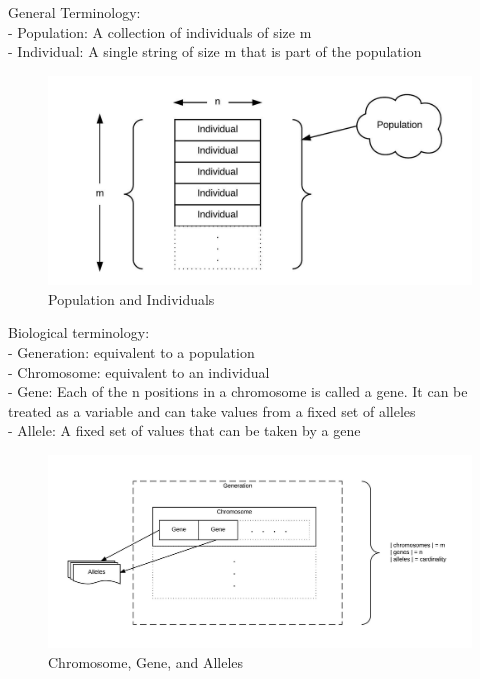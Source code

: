 \documentclass[12pt,a4paper]{article}
\begin{document}
	General Terminology: \\
	- Population: A collection of individuals of size m \\
	- Individual: A single string of size m that is part of the population \par
   	\begin{figure}[H]
   		\includegraphics[width=\textwidth]{"population"}
   		\caption{Population and Individuals}
   		\centering
   	\end{figure}
	
	Biological terminology: \\
	- Generation: equivalent to a population \\
	- Chromosome: equivalent to an individual \\
	- Gene: Each of the n positions in a chromosome is called a gene. It can be treated as a variable and can take values from a fixed set of alleles \\
	- Allele: A fixed set of values that can be taken by a gene \par

   	\begin{figure}[H]
   		\includegraphics[width=\textwidth]{"generation"}
   		\caption{Chromosome, Gene, and Alleles}
   		\centering
   	\end{figure}
\end{document}
